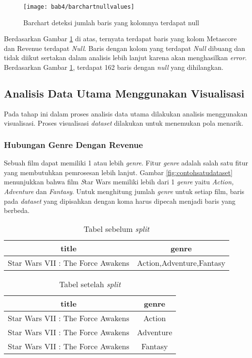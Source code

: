 \begin{figure}[H]
	\centering  
	\texttt{[image: bab4/barchartnullvalues]}   
	\caption{Barchart deteksi jumlah baris yang kolomnya terdapat null}
	\label{fig:barchartnullvalues} 
\end{figure} 

Berdasarkan Gambar \ref{fig:barchartnullvalues} di atas, ternyata terdapat baris yang kolom Metascore dan Revenue terdapat \textit{Null}. Baris dengan kolom yang terdapat \textit{Null} dibuang dan tidak diikut sertakan dalam analisis lebih lanjut karena akan menghasilkan \textit{error}. Berdasarkan Gambar \ref{fig:barchartnullvalues}, terdapat 162 baris dengan \textit{null} yang dihilangkan.

\subsection{Analisis Data Utama Menggunakan Visualisasi}
Pada tahap ini dalam proses analisis data utama dilakukan analisis menggunakan visualisasi. Proses visualisasi \textit{dataset} dilakukan untuk menemukan pola menarik.

\subsubsection{Hubungan Genre Dengan Revenue}

Sebuah film dapat memiliki 1 atau lebih \textit{genre}. Fitur \textit{genre} adalah salah satu fitur yang membutuhkan pemrosesan lebih lanjut. Gambar \ref{fig:contohsatudataset} menunjukkan bahwa film \textit Star Wars memiliki lebih dari 1 \textit{genre} yaitu \textit{Action, Adventure }dan \textit{Fantasy}. Untuk menghitung jumlah \textit{genre} untuk setiap film, baris pada \textit{dataset} yang dipisahkan dengan koma harus dipecah menjadi baris yang berbeda.

\begin{table}[H]
\caption{Tabel sebelum \textit{split}}
\centering
\begin{tabular}{|c|c|}
\hline 
title & genre \\ 
\hline 
Star Wars VII : The Force Awakens & Action,Adventure,Fantasy \\ 
\hline 
\end{tabular} 
\label{tab:contohrowsebelumsplit}
\end{table}

\begin{table}[H]
\caption{Tabel setelah \textit{split}}
\centering
\begin{tabular}{|c|c|}
\hline 
title & genre \\ 
\hline 
Star Wars VII : The Force Awakens & Action \\ 
\hline 
Star Wars VII : The Force Awakens & Adventure \\ 
\hline 
Star Wars VII : The Force Awakens & Fantasy \\ 
\hline 
\end{tabular} 
\label{tab:contohrowsetelahsplit}
\end{table}

